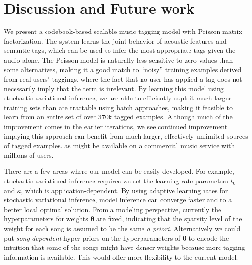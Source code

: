 \section{Discussion and Future work}\label{sec:conclusion}
We present a codebook-based scalable music tagging model with Poisson matrix factorization. 
The system learns the joint behavior of acoustic features and semantic tags, which can be used to infer 
the most appropriate tags given the audio alone.  The Poisson model is naturally less sensitive to 
zero values than some alternatives, making it a good match to ``noisy'' training examples derived from 
real users' taggings, where the fact that no user has applied a tag does not necessarily imply that the term is irrelevant.  By learning this model using stochastic variational inference, we are able to efficiently 
exploit much larger training sets than are tractable using batch approaches, making it feasible to learn 
from an entire set of over 370k tagged examples.  Although much of the improvement comes in the earlier iterations, we see continued improvement implying this approach can benefit from much larger, effectively unlimited sources of tagged examples, as might be available on a commercial music service with millions of users.

There are a few areas where our model can be easily developed. For example, stochastic variational inference requires we set the learning rate parameters $t_0$ and $\kappa$, which is application-dependent. By using adaptive learning rates for stochastic variational inference\cite{ranganath2013adaptive}, model inference can converge faster and to a better local optimal solution. From a modeling perspective, currently the hyperparameters for weights $\boldsymbol{\theta}$ are fixed, indicating that the sparsity level of the weight for each song is assumed to be the same \emph{a priori}. Alternatively we could put \emph{song-dependent} hyper-priors on the hyperparameters of $\boldsymbol{\theta}$ to encode the intuition that some of the songs might have denser weights because more tagging information is available. This would offer more flexibility to the current model. 



%



